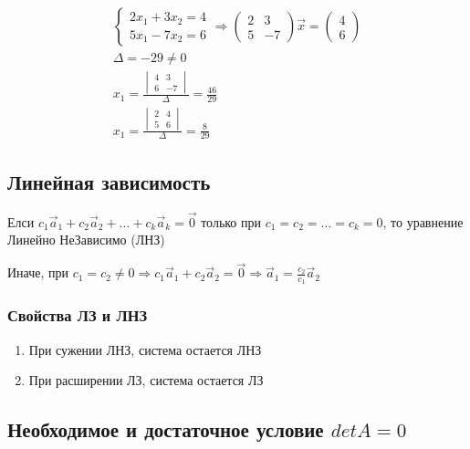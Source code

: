\documentclass{article}
\begin{document}
\begin{gather*}
	\begin{cases}
		2x_1 + 3x_2 = 4 \\
		5x_1 - 7x_2 = 6
	\end{cases} \Rightarrow
	\begin{pmatrix}
		2 & 3 \\
		5 & -7
	\end{pmatrix} \vec{x} =
	\begin{pmatrix}
		4 \\
		6
	\end{pmatrix} \\
	\Delta = -29 \ne 0 \\
	x_1 = \frac{\begin{vmatrix}
		4 & 3 \\
		6 & -7
	\end{vmatrix}}{\Delta} = \frac{46}{29} \\
	x_1 = \frac{\begin{vmatrix}
		2 & 4 \\
		5 & 6
	\end{vmatrix}}{\Delta} = \frac{8}{29}
\end{gather*}

\subsection{Линейная зависимость}

Елси $c_1 \vec{a}_1 + c_2 \vec{a}_2 + \dots + c_k \vec{a}_k = \vec{0}$ только при
$c_1 = c_2 = \dots = c_k = 0$, то уравнение Линейно НеЗависимо (ЛНЗ)

Иначе, при $c_1 = c_2 \ne 0 \Rightarrow c_1 \vec{a}_1 + c_2 \vec{a}_2 = \vec{0} \Rightarrow \vec{a}_1 = \frac{c_2}{c_1} \vec{a}_2$

\subsubsection{Свойства ЛЗ и ЛНЗ}

\begin{enumerate}
	\item При сужении ЛНЗ, система остается ЛНЗ
	\item При расширении ЛЗ, система остается ЛЗ
\end{enumerate}

\subsection{Необходимое и достаточное условие $det A = 0$}
\end{document}
